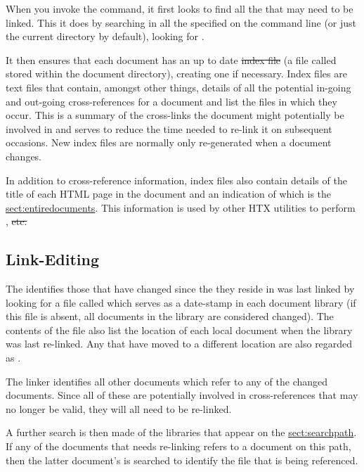 When you invoke the  command, it first looks to
find all the  that may need to be linked. This it
does by searching in all the  specified on
the command line (or just the current directory by default), looking
for .

It then ensures that each document has an up to date \st{index file}
(a file called  stored within the document directory),
creating one if necessary. Index files are text files that contain,
amongst other things, details of all the potential in-going and
out-going cross-references for a document and list the 
files in which they occur.  This is a summary of the cross-links the
document might potentially be involved in and serves to reduce the
time needed to re-link it on subsequent occasions. New index files are
normally only re-generated when a document changes.

In addition to cross-reference information, index files also contain
details of the title of each HTML page in the document and an
indication of which is the \hyperref{\qt{top} page}{\qt{top} page (see
\S}{)}{sect:entiredocuments}. This information is used by other HTX
utilities to perform , \st{etc.}

\subsection{\label{sect:linkediting}Link-Editing}

The  identifies those  that have
changed since the  they reside in was last linked by
looking for a file called  which serves as a date-stamp in
each document library (if this file is absent, all documents in the
library are considered changed). The contents of the  file
also list the location of each local document when the library was
last re-linked. Any that have moved to a different location are also
regarded as .

The linker identifies all other documents which refer to any of the
changed documents. Since all of these are potentially involved in
cross-references that may no longer be valid, they will all need to be
re-linked.

A further search is then made of the libraries that appear on the
\hyperref{\hi{HTX\_PATH} search path}{\hi{HTX\_PATH} search path (see
\S}{)}{sect:searchpath}. If any of the documents that needs re-linking
refers to a document on this path, then the latter document's
 is searched to identify the  file
that is being referenced.

